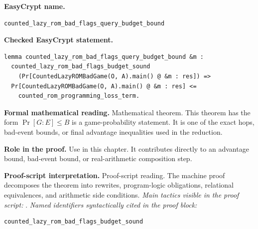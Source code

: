 \begin{formaltheorem}
\noindent\textbf{EasyCrypt name.}
\begin{lstlisting}[language=EasyCrypt,basicstyle=\ttfamily\scriptsize]
counted_lazy_rom_bad_flags_query_budget_bound
\end{lstlisting}
\noindent\textbf{Checked EasyCrypt statement.}
\begin{lstlisting}[language=EasyCrypt,basicstyle=\ttfamily\scriptsize]
lemma counted_lazy_rom_bad_flags_query_budget_bound &m :
  counted_lazy_rom_bad_flags_budget_sound
    (Pr[CountedLazyROMBadGame(O, A).main() @ &m : res]) =>
  Pr[CountedLazyROMBadGame(O, A).main() @ &m : res] <=
    counted_rom_programming_loss_term.
\end{lstlisting}
\noindent\textbf{Formal mathematical reading.}
Mathematical theorem. This theorem has the form \(\Pr[G:E] \le B\) is a game-probability statement.  It is one of the exact hops, bad-event bounds, or final advantage inequalities used in the reduction.

\noindent\textbf{Role in the proof.}
Use in this chapter. It contributes directly to an advantage bound, bad-event bound, or real-arithmetic composition step.

\noindent\textbf{Proof-script interpretation.}
Proof-script reading. The machine proof decomposes the theorem into rewrites, program-logic obligations, relational equivalences, and arithmetic side conditions.
\emph{Main tactics visible in the proof script:} .
\emph{Named identifiers syntactically cited in the proof block:}
\begin{lstlisting}[language=EasyCrypt,basicstyle=\ttfamily\scriptsize]
counted_lazy_rom_bad_flags_budget_sound
\end{lstlisting}

\end{formaltheorem}

